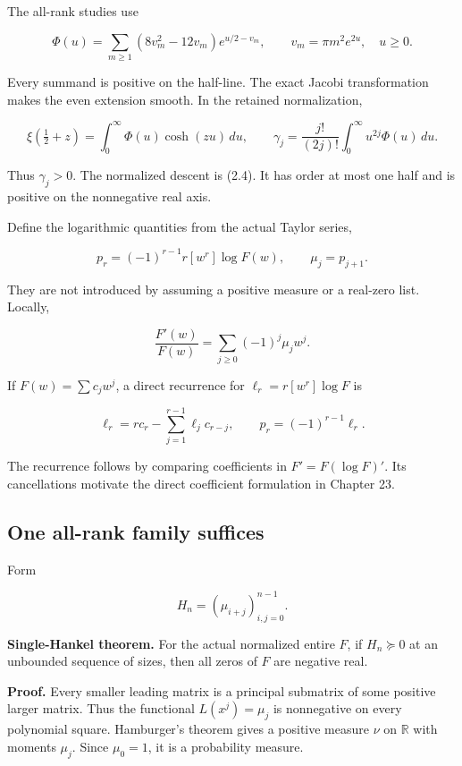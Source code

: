 \documentclass[
  10pt,
  a4paper,
  10pt,
  oneside,
  openany]{book}
\begin{document}
The all-rank studies use

\[
\Phi(u)=\sum_{m\ge1}(8v_m^2-12v_m)e^{u/2-v_m},
\qquad v_m=\pi m^2e^{2u},\quad u\ge0.
\tag{19.1}\label{eq:19.1}
\]

Every summand is positive on the half-line. The exact Jacobi
transformation makes the even extension smooth. In the retained
normalization,

\[
\xi(\tfrac12+z)=\int_0^\infty\Phi(u)\cosh(zu)\,du,
\qquad
\gamma_j=\frac{j!}{(2j)!}\int_0^\infty u^{2j}\Phi(u)\,du.
\tag{19.2}\label{eq:19.2}
\]

Thus \(\gamma_j>0\). The normalized descent is (2.4). It has order at
most one half and is positive on the nonnegative real axis.

Define the logarithmic quantities from the actual Taylor series,

\[
p_r=(-1)^{r-1}r[w^r]\log F(w),
\qquad\mu_j=p_{j+1}.
\tag{19.3}\label{eq:19.3}
\]

They are not introduced by assuming a positive measure or a real-zero
list. Locally,

\[
\frac{F'(w)}{F(w)}=\sum_{j\ge0}(-1)^j\mu_jw^j.
\tag{19.4}\label{eq:19.4}
\]

If \(F(w)=\sum c_jw^j\), a direct recurrence for \(\ell_r=r[w^r]\log F\)
is

\[
\ell_r=rc_r-\sum_{j=1}^{r-1}\ell_jc_{r-j},
\qquad p_r=(-1)^{r-1}\ell_r.
\tag{19.5}\label{eq:19.5}
\]

The recurrence follows by comparing coefficients in \(F'=F(\log F)'\).
Its cancellations motivate the direct coefficient formulation in Chapter
23.

\subsection{One all-rank family
suffices}\label{one-all-rank-family-suffices}

Form

\[
H_n=(\mu_{i+j})_{i,j=0}^{n-1}.
\tag{19.6}\label{eq:19.6}
\]

\textbf{Single-Hankel theorem.} For the actual normalized entire \(F\),
if \(H_n\succeq0\) at an unbounded sequence of sizes, then all zeros of
\(F\) are negative real.

\textbf{Proof.} Every smaller leading matrix is a principal submatrix of
some positive larger matrix. Thus the functional \(L(x^j)=\mu_j\) is
nonnegative on every polynomial square. Hamburger's theorem gives a
positive measure \(\nu\) on \(\mathbb R\) with moments \(\mu_j\). Since
\(\mu_0=1\), it is a probability measure.
\end{document}
